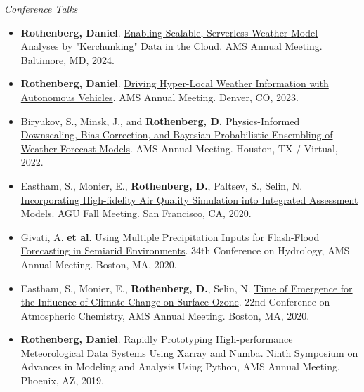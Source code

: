 \documentclass[11pt,letterpaper]{article}
\begin{document}
\bigskip
\emph{Conference Talks}
\medskip
\begin{itemize}[itemindent=-10pt]

 \item \textbf{Rothenberg, Daniel}. \href{https://ams.confex.com/ams/104ANNUAL/meetingapp.cgi/Paper/440122}{Enabling Scalable, Serverless Weather Model Analyses by "Kerchunking" Data in the Cloud}. AMS Annual Meeting. Baltimore, MD, 2024.

 \item \textbf{Rothenberg, Daniel}. \href{https://ams.confex.com/ams/103ANNUAL/meetingapp.cgi/Paper/412555}{Driving Hyper-Local Weather Information with Autonomous Vehicles}. AMS Annual Meeting. Denver, CO, 2023.
 
 \item Biryukov, S., Minsk, J., and \textbf{Rothenberg, D.} \href{https://ams.confex.com/ams/102ANNUAL/meetingapp.cgi/Paper/389735}{Physics-Informed Downscaling, Bias Correction, and Bayesian Probabilistic Ensembling of Weather Forecast Models}. AMS Annual Meeting. Houston, TX / Virtual, 2022.

 \item Eastham, S., Monier, E., \textbf{Rothenberg, D.}, Paltsev, S., Selin, N. \href{https://agu.confex.com/agu/fm20/meetingapp.cgi/Paper/740077}{Incorporating High-fidelity Air Quality Simulation into Integrated Assessment Models}. AGU Fall Meeting. San Francisco, CA, 2020.

 \item Givati, A. \textbf{et al}. \href{https://ams.confex.com/ams/2020Annual/meetingapp.cgi/Paper/369441}{Using Multiple Precipitation Inputs for Flash-Flood Forecasting in Semiarid Environments}. 34th Conference on Hydrology, AMS Annual Meeting. Boston, MA, 2020.

 \item Eastham, S., Monier, E., \textbf{Rothenberg, D.}, Selin, N. \href{https://ams.confex.com/ams/2020Annual/meetingapp.cgi/Paper/369266}{Time of Emergence for the Influence of Climate Change on Surface Ozone}. 22nd Conference on Atmospheric Chemistry, AMS Annual Meeting. Boston, MA, 2020.

 \item \textbf{Rothenberg, Daniel}. \href{https://ams.confex.com/ams/2019Annual/meetingapp.cgi/Paper/348989}{Rapidly Prototyping High-performance Meteorological Data Systems Using Xarray and Numba}. Ninth Symposium on Advances in Modeling and Analysis Using Python, AMS Annual Meeting. Phoenix, AZ, 2019.
 

\end{itemize}
\end{document}
